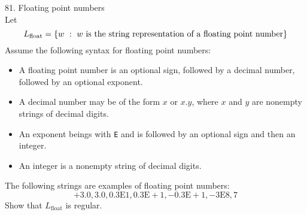 \documentclass[10pt]{article}
\begin{document}
\begin{exersoln}{81. Floating point numbers}
~\\Let 
\[L_{\mathrm{float}} = \left\lbrace w\ :\ w~\textrm{is the string representation of a floating point number} \right\rbrace\]
Assume the following syntax for floating point numbers:
\begin{itemize}
\item A floating point number is an optional sign, followed by a decimal number, followed by an optional exponent.
\item A decimal number may be of the form $x$ or $x.y$, where $x$ and $y$ are nonempty strings of decimal digits.
\item An exponent beings with \texttt{E} and is followed by an optional sign and then an integer.
\item An integer is a nonempty string of decimal digits.
\end{itemize}
The following strings are examples of floating point numbers:
\[\mathrm{+3.0, 3.0, 0.3E1, 0.3E+1, -0.3E+1, -3E8, 7}\]
Show that $L_{\mathrm{float}}$ is regular.
\end{exersoln}




%	
\end{document}
